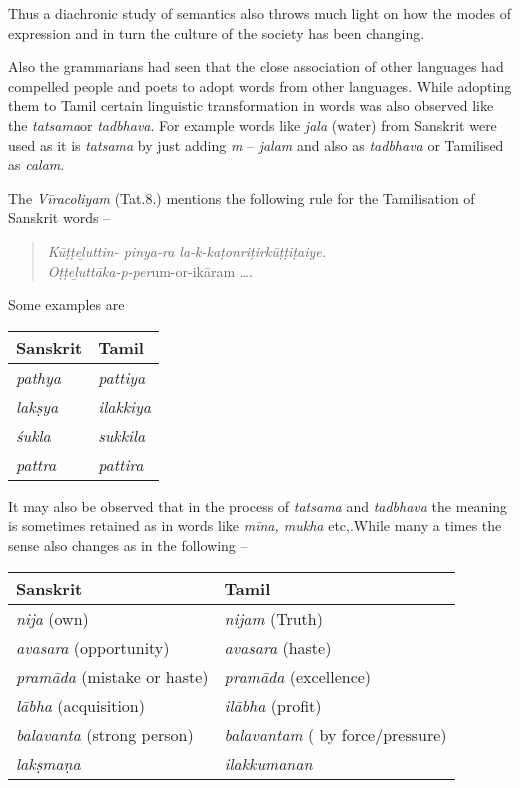 Thus a diachronic study of semantics also throws much light on how the modes of expression and in turn the culture of the society has been changing.

Also the grammarians had seen that the close association of other languages had compelled people and poets to adopt words from other languages. While adopting them to Tamil certain linguistic transformation in words was also observed like the \textit{tatsama}or \textit{tadbhava}. For example words like \textit{jala} (water) from Sanskrit were used as it is \textit{tatsama} by just adding \textit{m} – \textit{jalam} and also as \textit{tadbhava} or Tamilised as \textit{calam}.

The \textit{Vīracoliyam} (Tat.8.) mentions the following rule for the Tamilisation of Sanskrit words –

\begin{verse}
\textit{Kūṭṭeḻuttin- pinya-ra la-k-kaṭonriṭirkūṭṭiṭaiye.}\\\textit{Oṭṭeḻuttāka-p-per}um-or-ikāram ….
\end{verse}

Some examples are

\begin{longtable}{|l|l|}
\hline
\textbf{Sanskrit} & \textbf{Tamil} \\
\hline
\textit{pathya} & \textit{pattiya} \tabularnewline
\hline
\textit{lakṣya} & \textit{ilakkiya} \tabularnewline
\hline
\textit{śukla} & \textit{sukkila} \tabularnewline
\hline
\textit{pattra} & \textit{pattira} \tabularnewline
\hline
\end{longtable}

It may also be observed that in the process of \textit{tatsama} and \textit{tadbhava} the meaning is sometimes retained as in words like \textit{mīna, mukha} etc,.While many a times the sense also changes as in the following –

\begin{longtable}{|l|l|}
\hline
\textbf{Sanskrit} & \textbf{Tamil} \\
\hline
\textit{nija} (own) & \textit{nijam} (Truth) \tabularnewline
\hline
\textit{avasara} (opportunity) & \textit{avasara} (haste) \tabularnewline
\hline
\textit{pramāda} (mistake or haste) & \textit{pramāda} (excellence) \tabularnewline
\hline
\textit{lābha} (acquisition) & \textit{ilābha} (profit) \tabularnewline
\hline
\textit{balavanta} (strong person) & \textit{balavantam} ( by force/pressure) \tabularnewline
\hline
\textit{lakṣmaṇa} & \textit{ilakkumanan} \tabularnewline
\hline
\end{longtable}

